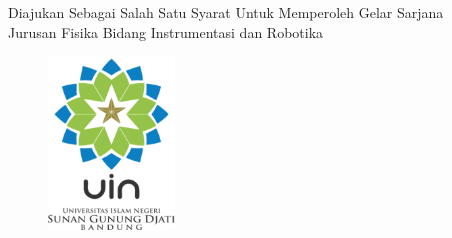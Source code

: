 \NoBgThispage

\begin{titlepage}
    \begin{center}
        \bf
        \large \MakeUppercase{\judul} \\
        \vspace{0.5cm}
        \MakeUppercase{\jeniskaryatulis} \\
        \vspace{0.75cm}
        
        Diajukan Sebagai Salah Satu Syarat Untuk Memperoleh Gelar Sarjana \\
        Jurusan Fisika Bidang Instrumentasi dan Robotika \\
        \vspace{0.5cm}
        
        \begin{figure}[h]
            \centering
            \includegraphics[width=0.30\textwidth]{images/Logo UIN.png}
        \end{figure}
        
        \vspace{1cm}
        \MakeUppercase{
            \underline{\namapenulis} \\
            \nimpenulis \\
            \vspace{2cm}
            \jurusan \\
            \fakultas \\
            \universitas \\
            \tahun
        }
    \end{center}
\end{titlepage}